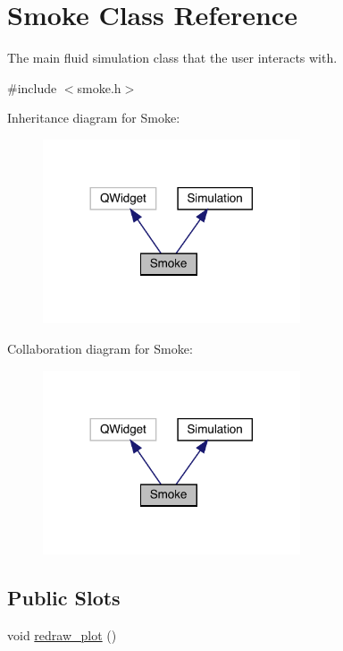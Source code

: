 \hypertarget{classSmoke}{}\section{Smoke Class Reference}
\label{classSmoke}


The main fluid simulation class that the user interacts with.  




{\ttfamily \#include $<$smoke.\+h$>$}



Inheritance diagram for Smoke\+:\nopagebreak
\begin{figure}[H]
\begin{center}
\leavevmode
\includegraphics[width=216pt]{classSmoke__inherit__graph}
\end{center}
\end{figure}


Collaboration diagram for Smoke\+:\nopagebreak
\begin{figure}[H]
\begin{center}
\leavevmode
\includegraphics[width=216pt]{classSmoke__coll__graph}
\end{center}
\end{figure}
\subsection*{Public Slots}
\begin{DoxyCompactItemize}
\item 
void \mbox{\hyperlink{classSmoke_af856939211a558bf5dcd6feece65ad9d}{redraw\+\_\+plot}} ()
\end{DoxyCompactItemize}
